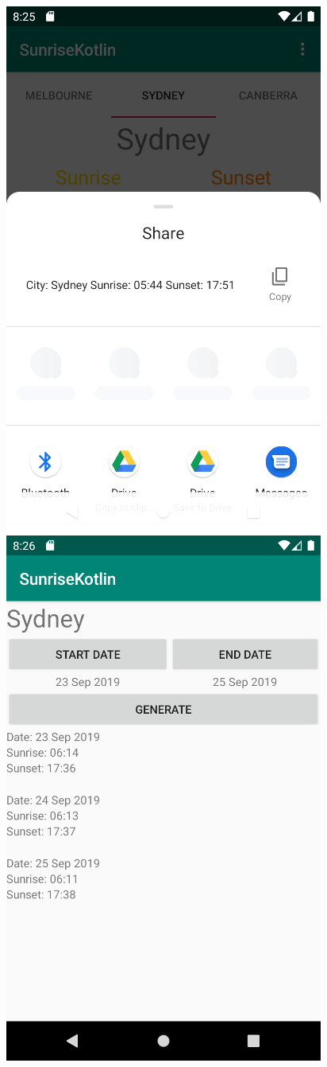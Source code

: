 \documentclass{scrartcl}
\begin{document}
\begin{figure}[h]
    \centering
    \includegraphics[scale=0.5]{images/screen3.png}
    \includegraphics[scale=0.5]{images/screen4.png}

\end{figure}
\end{document}
